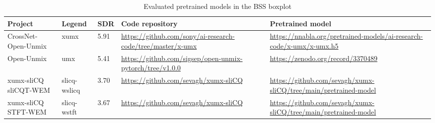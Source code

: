 \documentclass[report.tex]{subfiles}
\begin{document}
\begin{table}[ht]
	\centering
	\caption{Evaluated pretrained models in the BSS boxplot}
	\label{table:bsseval}
	\begin{tabular}{ |p{2.5cm}|l|l|p{4cm}|p{4cm}| }
	 \hline
		Project & Legend & SDR & Code repository & Pretrained model \\
	 \hline
	 \hline
		CrossNet-Open-Unmix & xumx & 5.91 & \url{https://github.com/sony/ai-research-code/tree/master/x-umx} & \url{https://nnabla.org/pretrained-models/ai-research-code/x-umx/x-umx.h5} \\
	 \hline
		Open-Unmix & umx & 5.41 & \url{https://github.com/sigsep/open-unmix-pytorch/tree/v1.0.0} & \url{https://zenodo.org/record/3370489} \\
	 \hline
		\makecell[l]{xumx-sliCQ \\ sliCQT-WEM} & slicq-wslicq & 3.70 & \url{https://github.com/sevagh/xumx-sliCQ} & \url{https://github.com/sevagh/xumx-sliCQ/tree/main/pretrained-model} \\
	 \hline
		\makecell[l]{xumx-sliCQ \\ STFT-WEM} & slicq-wstft & 3.67 & \url{https://github.com/sevagh/xumx-sliCQ} & \url{https://github.com/sevagh/xumx-sliCQ/tree/main/pretrained-model} \\
	 \hline
\end{tabular}
\end{table}
\end{document}
